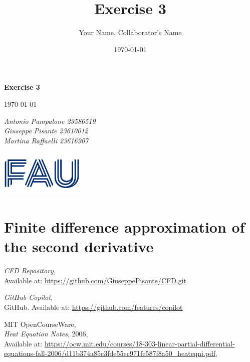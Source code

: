 \documentclass{article}
\title{Exercise 3}
\author{Your Name, Collaborator's Name}
\date{\today}
\begin{document}
\begin{titlepage}
    \centering
    \vspace*{1in}
    
    {\Huge\bfseries Exercise 3\par}
    \vspace{1.5cm}
    {\Large \today\par}
    \vspace{1.5cm}
    {\Large\itshape Antonio Pampalone 23586519 \\ Giuseppe Pisante 23610012\\ Martina Raffaelli 23616907 \par}
    
    \vfill
    \includegraphics[width=0.3\textwidth]{FAU-Logo.png}\par\vspace{1cm} %
   
\end{titlepage}

\newpage
\small
\section{Finite difference approximation of the second derivative}

\begin{thebibliography}{9}
  \textit{CFD Repository},\\
  Available at: \url{https://github.com/GiuseppePisante/CFD.git}
  
  \textit{GitHub Copilot},\\
  GitHub. Available at: \url{https://github.com/features/copilot}
  
  MIT OpenCourseWare,\\
  \textit{Heat Equation Notes}, 2006,\\
  Available at: \url{https://ocw.mit.edu/courses/18-303-linear-partial-differential-equations-fall-2006/d11b374a85c3fde55ec971fe587f8a50_heateqni.pdf},\\
\end{thebibliography}
\end{document}
